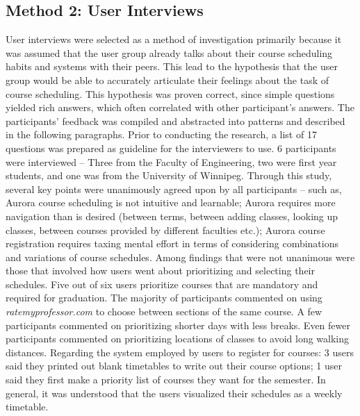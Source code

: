 \documentclass{article}
\begin{document}
\subsection{Method 2: User Interviews}
User interviews were selected as a method of investigation primarily because it was assumed that the user group already talks about their course scheduling habits and systems with their peers. This lead to the hypothesis that the user group would be able to accurately articulate their feelings about the task of course scheduling. This hypothesis was proven correct, since simple questions yielded rich answers, which often correlated with other participant’s answers. The participants’ feedback was compiled and abstracted into patterns and described in the following paragraphs. 
\newline
\newline
Prior to conducting the research, a list of 17 questions was prepared as guideline for the interviewers to use. 6 participants were interviewed – Three from the Faculty of Engineering, two were first year students, and one was from the University of Winnipeg.
\newline
\newline
Through this study, several key points were unanimously agreed upon by all participants – such as, Aurora course scheduling is not intuitive and learnable; Aurora requires more navigation than is desired (between terms, between adding classes, looking up classes, between courses provided by different faculties etc.); Aurora course registration requires taxing mental effort in terms of considering combinations and variations of course schedules. Among findings that were not unanimous were those that involved how users went about prioritizing and selecting their schedules. Five out of six users prioritize courses that are mandatory and required for graduation. The majority of participants commented on using \textit{ratemyprofessor.com} to choose between sections of the same course. A few participants commented on prioritizing shorter days with less breaks. Even fewer participants commented on prioritizing locations of classes to avoid long walking distances. Regarding the system employed by users to register for courses: 3 users said they printed out blank timetables to write out their course options; 1 user said they first make a priority list of courses they want for the semester. In general, it was understood that the users visualized their schedules as a weekly timetable. 
\end{document}
